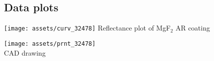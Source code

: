 \documentclass{article}
\begin{document}
\begin{multicols}{2}
\section{Data plots}

\begin{center}
\texttt{[image: assets/curv\_32478]}
Reflectance plot of MgF$_{2}$ AR coating
\end{center}


\end{multicols}

\begin{center}
\texttt{[image: assets/prnt\_32478]}
\\CAD drawing
\end{center}
\end{document}
